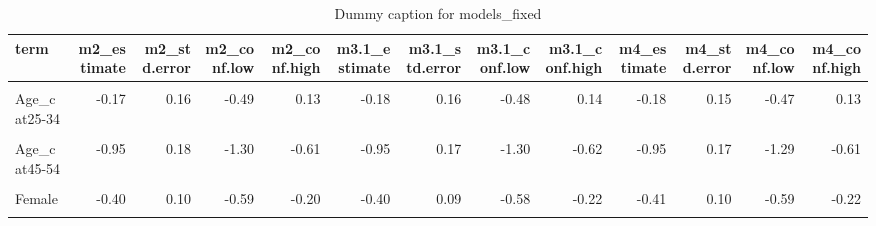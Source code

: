 \begin{table}
\centering
\caption{Dummy caption for models_fixed}
\centering
\fontsize{10}{12}\selectfont
\begin{tabular}[t]{lrrrrrrrrrrrr}
\toprule
term & m2\_estimate & m2\_std.error & m2\_conf.low & m2\_conf.high & m3.1\_estimate & m3.1\_std.error & m3.1\_conf.low & m3.1\_conf.high & m4\_estimate & m4\_std.error & m4\_conf.low & m4\_conf.high\\
\midrule
\cellcolor{gray!10}{(Intercept)} & \cellcolor{gray!10}{-2.07} & \cellcolor{gray!10}{0.89} & \cellcolor{gray!10}{-3.91} & \cellcolor{gray!10}{-0.11} & \cellcolor{gray!10}{-2.32} & \cellcolor{gray!10}{0.60} & \cellcolor{gray!10}{-3.74} & \cellcolor{gray!10}{-0.86} & \cellcolor{gray!10}{-2.14} & \cellcolor{gray!10}{0.71} & \cellcolor{gray!10}{-3.65} & \cellcolor{gray!10}{-0.59}\\
Age\_cat25-34 & -0.17 & 0.16 & -0.49 & 0.13 & -0.18 & 0.16 & -0.48 & 0.14 & -0.18 & 0.15 & -0.47 & 0.13\\
\cellcolor{gray!10}{Age\_cat35-44} & \cellcolor{gray!10}{-0.43} & \cellcolor{gray!10}{0.16} & \cellcolor{gray!10}{-0.74} & \cellcolor{gray!10}{-0.12} & \cellcolor{gray!10}{-0.43} & \cellcolor{gray!10}{0.16} & \cellcolor{gray!10}{-0.74} & \cellcolor{gray!10}{-0.10} & \cellcolor{gray!10}{-0.43} & \cellcolor{gray!10}{0.16} & \cellcolor{gray!10}{-0.73} & \cellcolor{gray!10}{-0.12}\\
Age\_cat45-54 & -0.95 & 0.18 & -1.30 & -0.61 & -0.95 & 0.17 & -1.30 & -0.62 & -0.95 & 0.17 & -1.29 & -0.61\\
\cellcolor{gray!10}{Age\_cat55+} & \cellcolor{gray!10}{-0.68} & \cellcolor{gray!10}{0.14} & \cellcolor{gray!10}{-0.94} & \cellcolor{gray!10}{-0.40} & \cellcolor{gray!10}{-0.68} & \cellcolor{gray!10}{0.14} & \cellcolor{gray!10}{-0.95} & \cellcolor{gray!10}{-0.40} & \cellcolor{gray!10}{-0.66} & \cellcolor{gray!10}{0.14} & \cellcolor{gray!10}{-0.93} & \cellcolor{gray!10}{-0.40}\\
Female & -0.40 & 0.10 & -0.59 & -0.20 & -0.40 & 0.09 & -0.58 & -0.22 & -0.41 & 0.10 & -0.59 & -0.22\\
\cellcolor{gray!10}{Incomequintile 2} & \cellcolor{gray!10}{-0.09} & \cellcolor{gray!10}{0.16} & \cellcolor{gray!10}{-0.40} & \cellcolor{gray!10}{0.24} & \cellcolor{gray!10}{-0.09} & \cellcolor{gray!10}{0.17} & \cellcolor{gray!10}{-0.41} & \cellcolor{gray!10}{0.23} & \cellcolor{gray!10}{-0.46} & \cellcolor{gray!10}{0.61} & \cellcolor{gray!10}{-1.69} & \cellcolor{gray!10}{0.71}\\

\end{tabular}
\end{table}

